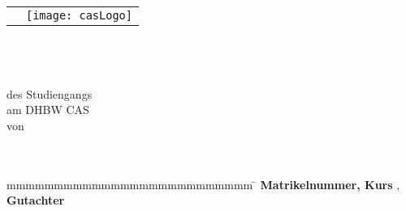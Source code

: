 \begin{titlepage}
	\begin{longtable}{p{8.2cm} p{5.4cm}}
		&
		\texttt{[image: casLogo]}
	\end{longtable}
	\enlargethispage{20mm}
	\begin{center}
		\vspace*{12mm}	{\LARGE\textbf \myTitel }\\
		\vspace*{12mm}	{\large\textbf \myArbeit}\\
		\vspace*{3mm}		{\textbf \myDegree}\\
		\vspace*{12mm}	des Studiengangs \myKurs\\
    \vspace*{3mm}		am DHBW CAS\\
		\vspace*{12mm}	von\\
		\vspace*{3mm}		{\large\textbf \myAutor}\\
		\vspace*{12mm}	\myDatum\\
	\end{center}
	\vfill
	\begin{spacing}{1.2}
	\begin{tabbing}
		mmmmmmmmmmmmmmmmmmmmmmmmmm             \= \kill
		\textbf{Matrikelnummer, Kurs}  \>  \myMatrikelnr, \myKurs\\
		\textbf{Gutachter}              \>  \myGutachter
	\end{tabbing}
	\end{spacing}
\end{titlepage}